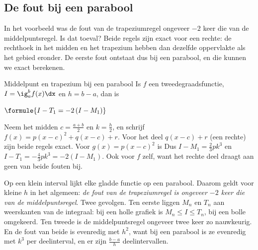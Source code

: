 \begin{oefeningen}
\end{oefeningen}

\subsection{De fout bij een parabool}

In het voorbeeld was de fout van de trapeziumregel ongeveer $-2$ keer die van de middelpuntsregel. Is dat toeval? Beide regels zijn exact voor een rechte: de rechthoek in het midden en het trapezium hebben dan dezelfde oppervlakte als het gebied eronder. De eerste fout ontstaat dus bij een parabool, en die kunnen we exact berekenen.

\begin{theorie}
\begin{stelling}{Middelpunt en trapezium bij een parabool}
Is $f$ een tweedegraadsfunctie, $I = \ig_a^b f(x)\dx$ en $h = b - a$, dan is

\vspace{1mm}
\qquad $\formule{I - T_1 = -2\,(I - M_1)}$
\end{stelling}

\begin{bewijs}
Neem het midden $c = \frac{a + b}{2}$ en $k = \frac h2$, en schrijf $f(x) = p(x - c)^2 + q(x - c) + r$. Voor het deel $q(x - c) + r$ (een rechte) zijn beide regels exact. Voor $g(x) = p(x - c)^2$ is
Dus $I - M_1 = \frac23 pk^3$ en $I - T_1 = -\frac43 pk^3 = -2(I - M_1)$. Ook voor $f$ zelf, want het rechte deel draagt aan geen van beide fouten bij.
\end{bewijs}
\end{theorie}

Op een klein interval lijkt elke gladde functie op een parabool. Daarom geldt voor kleine $h$ in het algemeen: \textit{de fout van de trapeziumregel is ongeveer $-2$ keer die van de middelpuntsregel}. Twee gevolgen. Ten eerste liggen $M_n$ en $T_n$ aan weerskanten van de integraal: bij een holle grafiek is $M_n \leqslant I \leqslant T_n$, bij een bolle omgekeerd. Ten tweede is de middelpuntsregel ongeveer twee keer zo nauwkeurig. En de fout van beide is evenredig met $h^2$, want bij een parabool is ze evenredig met $k^3$ per deelinterval, en er zijn $\frac{b - a}{h}$ deelintervallen.

